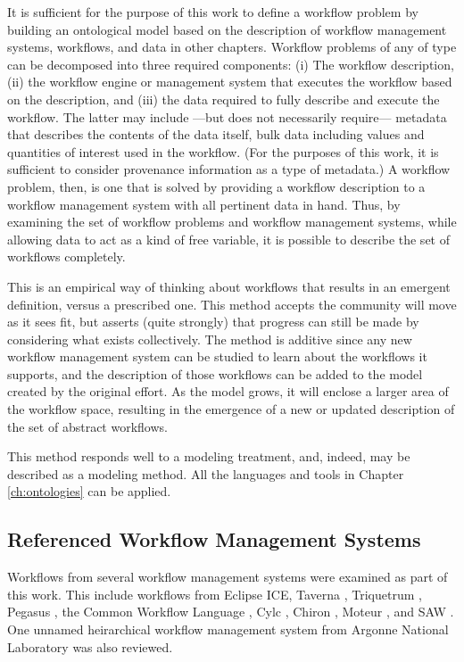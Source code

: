 It is sufficient for the purpose of this work to define a workflow problem
by building an ontological model based on the description of workflow
management systems, workflows, and data in other chapters. Workflow problems of
any of type can be decomposed into three required components: (i) The workflow
description, (ii) the workflow engine or management system that executes the
workflow based on the description, and (iii) the data required to fully describe
and execute the workflow. The latter may include ---but does not necessarily
require--- metadata that describes the contents of the data itself, bulk data
including values and quantities of interest used in the workflow. (For the purposes of
this work, it is sufficient to consider provenance information as a type of
metadata.) A workflow problem, then, is one that is solved by providing a
workflow description to a workflow management system with all pertinent data in
hand. Thus, by examining the set of workflow problems and workflow management
systems, while allowing data to act as a kind of free variable, it is possible
to describe the set of workflows completely.

This is an empirical way of thinking about workflows that results in an emergent
definition, versus a prescribed one. This method accepts the community will
move as it sees fit, but asserts (quite strongly) that progress can still be
made by considering what exists collectively. The method is additive since
any new workflow management system can be studied to learn about the
workflows it supports, and the description of those workflows can be added to
the model created by the original effort. As the model grows, it will enclose a
larger area of the workflow space, resulting in the emergence of a new or
updated description of the set of abstract workflows.

This method responds well to a modeling treatment, and, indeed, may be described
as a modeling method. All the languages and tools in Chapter \ref{ch:ontologies}
can be applied.

\subsection{Referenced Workflow Management Systems}

Workflows from several workflow management systems were examined as part of this
work. This include workflows from Eclipse ICE, Taverna
\cite{wolstencroft_taverna_2013}, Triquetrum \cite{brooks_introducing_2016},
Pegasus \cite{noauthor_pegasus_nodate}, the Common Workflow Language
\cite{noauthor_common-workflow-language:_2018}, Cylc
\cite{j_oliver_cylc:_2018}, Chiron \cite{ ogasawara_chiron:_nodate}, Moteur
\cite{glatard_flexible_2008}, and SAW \cite{clay_incorporating_2015}. One
unnamed heirarchical workflow management system from Argonne National
Laboratory was also reviewed.

